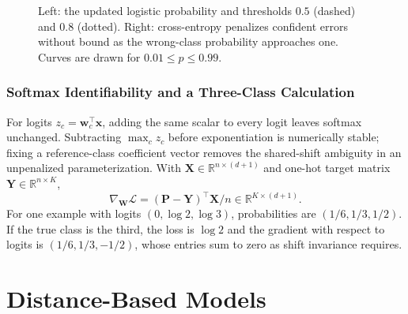 \documentclass[11pt,twoside]{article}
\numberwithin{equation}{section}
\newcommand{\R}{\mathbb{R}}
\newcommand{\vect}[1]{\bm{#1}}
\newcommand{\mat}[1]{\bm{#1}}
\newcommand{\Loss}{\mathcal{L}}
\theoremstyle{plain}
\theoremstyle{definition}
\theoremstyle{remark}
\begin{document}
\begin{figure}[H]
\centering
{}
\caption{Left: the updated logistic probability and thresholds $0.5$ (dashed) and $0.8$ (dotted). Right: cross-entropy penalizes confident errors without bound as the wrong-class probability approaches one. Curves are drawn for $0.01\le p\le0.99$.}
\end{figure}

\subsubsection{Softmax Identifiability and a Three-Class Calculation}
For logits $z_c=\vect w_c^\top\vect x$, adding the same scalar to every logit leaves softmax unchanged. Subtracting $\max_c z_c$ before exponentiation is numerically stable; fixing a reference-class coefficient vector removes the shared-shift ambiguity in an unpenalized parameterization. With $\mat X\in\R^{n\times(d+1)}$ and one-hot target matrix $\mat Y\in\R^{n\times K}$,
\[
\nabla_{\mat W}\Loss=(\mat P-\mat Y)^\top\mat X/n\in\R^{K\times(d+1)}.
\]
For one example with logits $(0,\log2,\log3)$, probabilities are $(1/6,1/3,1/2)$. If the true class is the third, the loss is $\log2$ and the gradient with respect to logits is $(1/6,1/3,-1/2)$, whose entries sum to zero as shift invariance requires.

\section{Distance-Based Models}
\label{sec:distance-models}
\end{document}
